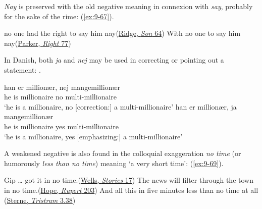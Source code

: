 \textit{Nay} is preserved with the old negative meaning in connexion with \textit{say}, probably for the sake of the rime: (\ref{ex:9-67}).

\ea \label{ex:9-67}
\ea no one had the right to say him nay\hfill(\href{https://www.gutenberg.org/cache/epub/57710/pg57710-images.html}{Ridge, \textit{Son} 64})
\ex
With no one to say him nay\hfill(\href{https://archive.org/details/bwb_UE-390-059/page/86/mode/2up?view=theater&q=%22with+no+one+to+say+him+nay%22}{Parker, \textit{Right} 77})
\z %
\z

In Danish, both \textit{ja} and \textit{nej} may be used in correcting or pointing out a statement: .

\ea \label{ex:09-new}
\ea
\gll han er millionær, nej mangemillionær\\
    he is millionaire no multi-millionaire\\
\glt `he is a millionaire, no [correction:] a multi-millionaire'
\ex
\gll han er millionær, ja mangemillionær\\  
    he is millionaire yes multi-millionaire\\ 
\glt `he is a millionaire, yes [emphasizing:] a multi-millionaire'
\z
\z

\bigskip
A weakened negative is also found in the colloquial exaggeration \textit{no time} (or humorously \textit{less than no time}) meaning `a very short time': (\ref{ex:9-69}).\largerpage[2]

\ea \label{ex:9-69}
\ea Gip {\dots} got it in no time.\hfill(\href{https://archive.org/details/HGWellsTwelveStoriesAndADream/page/n51/mode/2up?q=%22in+no+time%22}{Wells, \textit{Stories} 17}) %
\ex The news will filter through the town in no time.\hfill(\href{https://archive.org/details/in.ernet.dli.2015.53170/page/n263/mode/2up?q=%22news+will+filter%22&view=theater}{Hope, \textit{Rupert} 203})
\ex And all this in five minutes less than no time at all\\\hfill(\href{https://www.gutenberg.org/files/39270/39270-h/39270-h.htm#page170}{Sterne, \textit{Tristram} 3.38}) %
\z
\z

